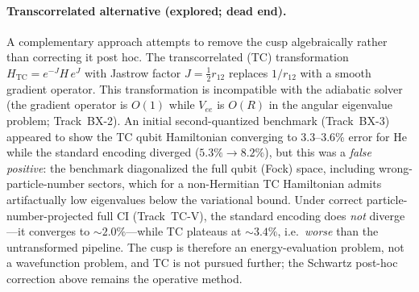 \documentclass[aps,pra,twocolumn,superscriptaddress,longbibliography]{revtex4-2}
\begin{document}
\paragraph{Transcorrelated alternative (explored; dead end).}
A complementary approach attempts to remove the cusp algebraically rather than
correcting it post hoc.  The transcorrelated (TC) transformation
$H_{\mathrm{TC}} = e^{-J} H\, e^{J}$ with Jastrow factor
$J = \tfrac{1}{2} r_{12}$ replaces $1/r_{12}$ with a smooth
gradient operator.  This transformation is incompatible with the
adiabatic solver (the gradient operator is $O(1)$ while $V_{ee}$ is
$O(R)$ in the angular eigenvalue problem; Track~BX-2).  An initial
second-quantized benchmark (Track~BX-3) appeared to show the TC qubit
Hamiltonian converging to 3.3--3.6\% error for He while the standard
encoding diverged ($5.3\%\to8.2\%$), but this was a \emph{false
positive}: the benchmark diagonalized the full qubit (Fock) space,
including wrong-particle-number sectors, which for a non-Hermitian TC
Hamiltonian admits artifactually low eigenvalues below the variational
bound.  Under correct particle-number-projected full CI (Track~TC-V),
the standard encoding does \emph{not} diverge---it converges to
${\sim}2.0\%$---while TC plateaus at ${\sim}3.4\%$, i.e.\ \emph{worse}
than the untransformed pipeline.  The cusp is therefore an
energy-evaluation problem, not a wavefunction problem, and TC is not
pursued further; the Schwartz post-hoc correction above remains the
operative method.
\end{document}
